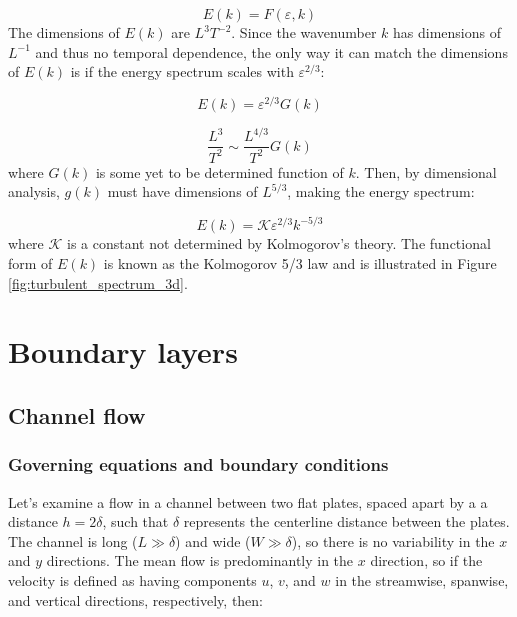 \documentclass[12pt]{article}
\numberwithin{equation}{section}
\numberwithin{figure}{section}
\numberwithin{table}{section}
\begin{document}
\begin{equation}
  E(k) = F(\varepsilon, k)
\end{equation}
The dimensions of $E(k)$ are $L^3 T^{-2}$.
Since the wavenumber $k$ has dimensions of $L^{-1}$ and thus no temporal
dependence, the only way it can match the dimensions of $E(k)$ is if the
energy spectrum scales with $\varepsilon^{2/3}$:

\begin{equation}
  E(k) = \varepsilon^{2/3} G(k)
\end{equation}

\begin{equation}
  \frac{L^3}{T^2} \sim \frac{L^{4/3}}{T^2} G(k)
\end{equation}
where $G(k)$ is some yet to be determined function of $k$.
Then, by dimensional analysis, $g(k)$ must have dimensions of $L^{5/3}$,
making the energy spectrum:

\begin{equation}
  E(k) = \mathcal{K} \varepsilon^{2/3} k^{-5/3}
\end{equation}
where $\mathcal{K}$ is a constant not determined by Kolmogorov's theory.
The functional form of $E(k)$ is known as the Kolmogorov 5/3 law and is
illustrated in Figure \ref{fig:turbulent_spectrum_3d}.

\newpage
\section{Boundary layers}

\subsection{Channel flow}

\subsubsection{Governing equations and boundary conditions}

Let's examine a flow in a channel between two flat plates, spaced apart by a
a distance $h = 2\delta$, such that $\delta$ represents the centerline distance
between the plates.
The channel is long ($L \gg \delta$) and wide ($W \gg \delta$), so there is no
variability in the $x$ and $y$ directions.
The mean flow is predominantly in the $x$ direction, so if the velocity is
defined as having components $u$, $v$, and $w$ in the streamwise, spanwise,
and vertical directions, respectively, then:
\end{document}

